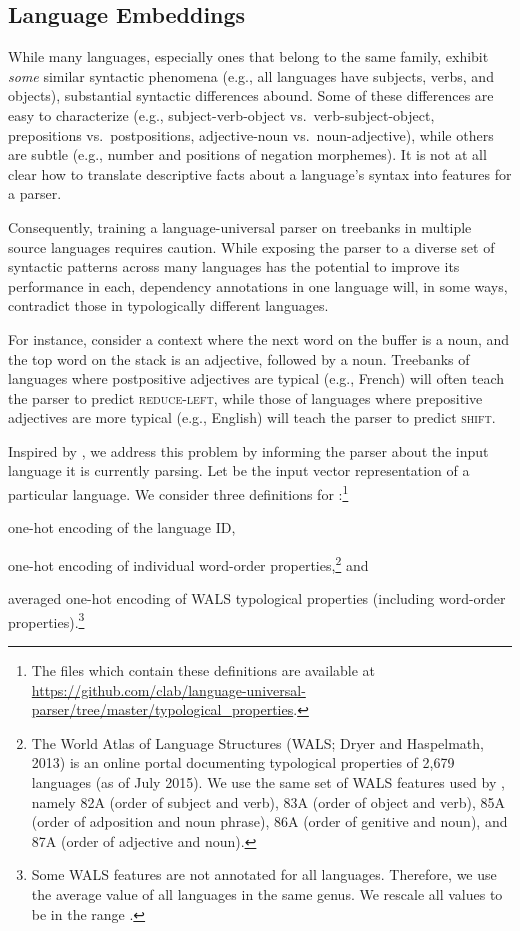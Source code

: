 \documentclass[11pt]{article}
\newenvironment{itemizesquish}{\begin{list}{\labelitemi}{\setlength{\itemsep}{0em}\setlength{\labelwidth}{0.5em}\setlength{\leftmargin}{\labelwidth}\addtolength{\leftmargin}{\labelsep}}}{\end{list}}
\begin{document}
\subsection{Language Embeddings}
\label{sec:lang}

While many languages, especially ones that belong to the same family, exhibit \textit{some} similar syntactic phenomena (e.g., all languages have subjects, verbs, and objects), substantial syntactic differences abound.
Some of these differences are easy to characterize (e.g., subject-verb-object vs.~verb-subject-object, prepositions vs.~postpositions, adjective-noun vs.~noun-adjective), while others are subtle (e.g., number and positions of negation morphemes).  It is not at all clear how to translate descriptive facts about a language's syntax into features for a parser.

Consequently, training a language-universal parser on treebanks in multiple source languages requires caution.  While exposing the parser to a diverse set of syntactic patterns across many languages has the potential to improve its performance in each, dependency annotations in one language will, in some ways, contradict those in typologically different languages.

For instance, consider a context where the next word on the buffer is a noun, and the top word on the stack is an adjective, followed by a noun.
Treebanks of languages where postpositive adjectives are typical (e.g., French) will often teach the parser to predict \textsc{reduce-left}, while those of languages where prepositive adjectives are more typical (e.g., English) will teach the parser to predict \textsc{shift}.

Inspired by ,
we address this problem by informing the parser about the input language it is currently parsing.  
Let  be the input vector representation of a particular language.
We consider three definitions for :\footnote{The files which contain these definitions are available at \url{https://github.com/clab/language-universal-parser/tree/master/typological_properties}.}
\begin{itemizesquish}
\item one-hot encoding of the language ID,
\item one-hot encoding of individual word-order properties,\footnote{The World Atlas of Language Structures (WALS; Dryer and Haspelmath, 2013) \nocite{dryer:13} is an online portal documenting typological properties of 2,679 languages (as of July 2015). We use the same set of WALS features used by , namely 82A (order of subject and verb), 83A (order of object and verb), 85A (order of adposition and noun phrase), 86A (order of genitive and noun), and 87A (order of adjective and noun).} and 
\item averaged one-hot encoding of WALS typological properties (including word-order properties).\footnote{Some WALS features are not annotated for all languages. Therefore, we use the average value of all languages in the same genus. We rescale all values to be in the range .}
\end{itemizesquish}
\end{document}
